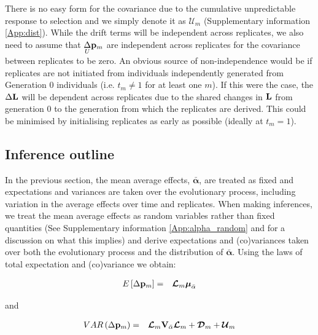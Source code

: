 \documentclass[12pt]{article}
\begin{document}
\begin{bibunit}
There is no easy form for the covariance due to the cumulative unpredictable response to selection and we simply denote it as $\boldsymbol{\mathcal{U}}_m$ (Supplementary information \ref{App:dist}). While the drift terms will be independent across replicates, we also need to assume that $\underset{U}\Delta {\bf p}_{m}$ are independent across replicates for the covariance between replicates to be zero. An obvious source of non-independence would be if replicates are not initiated from individuals independently generated from Generation $0$ individuals (i.e. $t_m\neq1$ for at least one $m$). If this were the case, the $\Delta {\bf L}$ will be dependent across replicates due to the shared changes in ${\bf L}$ from generation $0$ to the generation from which the replicates are derived. This could be minimised by initialising replicates as early as possible (ideally at $t_m=1$).\\   

\subsection*{Inference outline}

In the previous section, the mean average effects,  $\bar{\boldsymbol{\alpha}}$, are treated as fixed and expectations and variances are taken over the evolutionary process, including variation in the average effects over time and replicates. When making inferences, we treat the mean average effects as random variables rather than fixed quantities (See Supplementary information \ref{App:alpha_random} and \citet{gianola2009additive} for a discussion on what this implies) and derive expectations and (co)variances taken over both the evolutionary process and the distribution of $\bar{\boldsymbol{\alpha}}$. Using the laws of total expectation and (co)variance we obtain:

\begin{equation}
\begin{array}{rl}
E\left[\Delta {\bf p}_m\right]
=& \boldsymbol{\mathcal{L}}_m\boldsymbol{\mu}_{\bar{\alpha}}\\
\end{array}
\label{eq:Edelta}
\end{equation}

and 

\begin{equation}
\begin{array}{rl}
VAR\left(\Delta {\bf p}_m\right) =&\boldsymbol{\mathcal{L}}_m{\bf V}_{\bar{\alpha}}\boldsymbol{\mathcal{L}}_m+\boldsymbol{\mathcal{D}}_m+\boldsymbol{\mathcal{U}}_m\\
\end{array}
\end{equation}


\end{bibunit}
\end{document}
